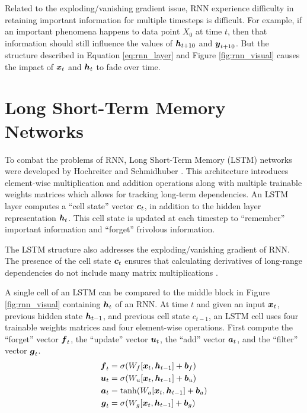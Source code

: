 Related to the exploding/vanishing gradient issue, RNN experience difficulty in retaining important information for multiple timesteps is difficult. For example, if an important phenomena happens to data point $X_0$ at time $t$, then that information should still influence the values of $\boldsymbol{h}_{t+10}$ and $\boldsymbol{y}_{t+10}$. But the structure described in Equation \ref{eq:rnn_layer} and Figure \ref{fig:rnn_visual} causes the impact of $\boldsymbol{x}_t$ and $\boldsymbol{h}_t$ to fade over time.


\section{Long Short-Term Memory Networks}\label{sec:lstm}
To combat the problems of RNN, Long Short-Term Memory (LSTM) networks were developed by Hochreiter and Schmidhuber \cite{hochreiter1997}. This architecture introduces element-wise multiplication and addition operations along with multiple trainable weights matrices which allows for tracking long-term dependencies. An LSTM layer computes a ``cell state'' vector $\boldsymbol{c}_t$, in addition to the hidden layer representation $\boldsymbol{h}_t$. This cell state is updated at each timestep to ``remember'' important information and ``forget'' frivolous information.

The LSTM structure also addresses the exploding/vanishing gradient of RNN. The presence of the cell state $\boldsymbol{c}_t$ ensures that calculating derivatives of long-range dependencies do not include many matrix multiplications \cite{hochreiter1997}.

A single cell of an LSTM can be compared to the middle block in Figure \ref{fig:rnn_visual} containing $\boldsymbol{h}_t$ of an RNN. At time $t$ and given an input $\boldsymbol{x}_t$, previous hidden state $\boldsymbol{h}_{t-1}$, and previous cell state $c_{t-1}$, an LSTM cell uses four trainable weights matrices and four element-wise operations. First compute the ``forget'' vector $\boldsymbol{f}_t$, the ``update'' vector $\boldsymbol{u}_t$, the ``add'' vector $\boldsymbol{a}_t$, and the ``filter'' vector $\boldsymbol{g}_t$.
\begin{equation}
\begin{split}
  \boldsymbol{f}_t &= \sigma(W_f [\boldsymbol{x}_t, \boldsymbol{h}_{t-1}] + \boldsymbol{b}_f) \\
  \boldsymbol{u}_t &= \sigma(W_u [\boldsymbol{x}_t, \boldsymbol{h}_{t-1}] + \boldsymbol{b}_u) \\
  \boldsymbol{a}_t &= \tanh(W_a [\boldsymbol{x}_t, \boldsymbol{h}_{t-1}] + \boldsymbol{b}_a) \\
  \boldsymbol{g}_t &= \sigma(W_g [\boldsymbol{x}_t, \boldsymbol{h}_{t-1}] + \boldsymbol{b}_g)
\end{split}
  \label{eq:lstm_vects}
\end{equation}

